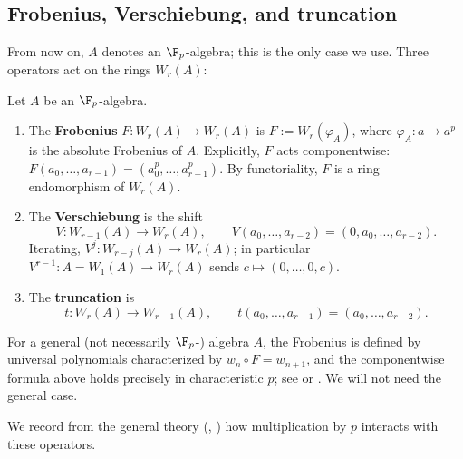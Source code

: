 \subsection{Frobenius, Verschiebung, and truncation}

From now on, $A$ denotes an $\F_p$-algebra; this is the only case we use. Three
operators act on the rings $W_r(A)$:

\begin{definition}\label{definition:witt_operators}
Let $A$ be an $\F_p$-algebra.
\begin{enumerate}
    \item The \textbf{Frobenius} $F \colon W_r(A) \to W_r(A)$ is
    $F := W_r(\varphi_A)$, where $\varphi_A \colon a \mapsto a^p$ is the absolute
    Frobenius of $A$. Explicitly, $F$ acts componentwise:
    $F(a_0, \dots, a_{r-1}) = (a_0^p, \dots, a_{r-1}^p)$. By functoriality, $F$ is a
    ring endomorphism of $W_r(A)$.
    \item The \textbf{Verschiebung} is the shift
    \[
    V \colon W_{r-1}(A) \to W_r(A),
    \qquad
    V(a_0, \dots, a_{r-2}) = (0, a_0, \dots, a_{r-2}).
    \]
    Iterating, $V^j \colon W_{r-j}(A) \to W_r(A)$; in particular
    $V^{r-1} \colon A = W_1(A) \to W_r(A)$ sends $c \mapsto (0, \dots, 0, c)$.
    \item The \textbf{truncation} is
    \[
    t \colon W_r(A) \to W_{r-1}(A),
    \qquad
    t(a_0, \dots, a_{r-1}) = (a_0, \dots, a_{r-2}).
    \]
\end{enumerate}
\end{definition}

\begin{rem*}
For a general (not necessarily $\F_p$-) algebra $A$, the Frobenius is defined by
universal polynomials characterized by $w_n \circ F = w_{n+1}$, and the componentwise
formula above holds precisely in characteristic $p$; see
\cite[II, \S6]{serreLF} or \cite[\S2]{Rabinoff2014Witt}. We will not need the general
case.
\end{rem*}

We record from the general theory (\cite[II, \S6]{serreLF},
\cite[\S2]{Rabinoff2014Witt}) how multiplication by $p$ interacts with these
operators.

